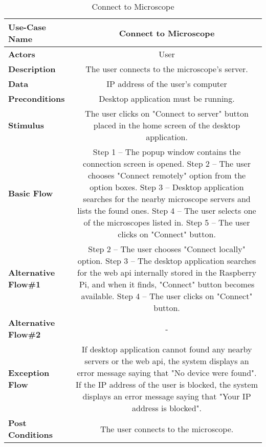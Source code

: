 \begin{table}[H]
     \centering
     \begin{tabular}{|l|C|}
         \hline
          \textbf{Use-Case Name} & Connect to Microscope \\
         \hline
          \textbf{Actors} & User \\ 
         \hline
          \textbf{Description} & The user connects to the microscope's server. \\ 
         \hline
          \textbf{Data} & IP address of the user's computer\\ 
         \hline
          \textbf{Preconditions} & 
          Desktop application must be running. \\
         \hline
          \textbf{Stimulus} & The user clicks on "Connect to server" button placed in the home screen of the desktop application.\\ 
         \hline
          \textbf{Basic Flow} & 
          Step 1 -- The popup window contains the connection screen is opened. \newline
          Step 2 -- The user chooses "Connect remotely" option from the option boxes. \newline
          Step 3 -- Desktop application searches for the nearby microscope servers and lists the found ones. \newline
          Step 4 -- The user selects one of the microscopes listed in. \newline
          Step 5 -- The user clicks on "Connect" button. \\
         \hline
          \textbf{Alternative Flow\#1} & 
          Step 2 -- The user chooses "Connect locally" option. \newline
          Step 3 -- The desktop application searches for the web api internally stored in the Raspberry Pi, and when it finds, "Connect" button becomes available. \newline
          Step 4 -- The user clicks on "Connect" button. \\
         \hline
          \textbf{Alternative Flow\#2} & - \\
         \hline
          \textbf{Exception Flow} & If desktop application cannot found any nearby servers or the web api, the system displays an error message saying that "No device were found". If the IP address of the user is blocked, the system displays an error message saying that "Your IP address is blocked".\\
         \hline
          \textbf{Post Conditions} & The user connects to the microscope. \\ 
         \hline
     \end{tabular}
     \caption{Connect to Microscope}
     \label{tab:connect_to_microscope}
 \end{table}